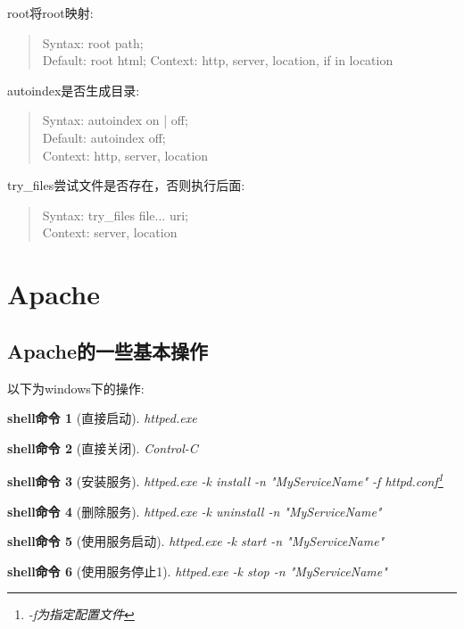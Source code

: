 \documentclass[UTF8]{ctexart}
\newtheorem{shellcommand}{shell命令}
\newenvironment{myquote}
  {\begin{quote} \kaishu \zihao{-5}}
  {\end{quote}}
\begin{document}
root将root映射:
\begin{myquote}
  Syntax: root path; \\
  Default: root html;
  Context: http, server, location, if in location
\end{myquote}

autoindex是否生成目录:
\begin{myquote}
  Syntax: autoindex on | off; \\
  Default: autoindex off; \\
  Context: http, server, location
\end{myquote}

try\_files尝试文件是否存在，否则执行后面:
\begin{myquote}
  Syntax: try\_files file... uri; \\
  Context: server, location
\end{myquote}

\clearpage


\section{Apache}
\subsection{Apache的一些基本操作}
以下为windows下的操作:
\begin{shellcommand}[直接启动]
  httped.exe
\end{shellcommand}

\begin{shellcommand}[直接关闭]
  Control-C
\end{shellcommand}

\begin{shellcommand}[安装服务]
  httped.exe -k install -n "MyServiceName" -f httpd.conf\footnote{-f为指定配置文件}
\end{shellcommand}

\begin{shellcommand}[删除服务]
  httped.exe -k uninstall -n "MyServiceName"
\end{shellcommand}

\begin{shellcommand}[使用服务启动]
  httped.exe -k start -n "MyServiceName"
\end{shellcommand}

\begin{shellcommand}[使用服务停止1]
  httped.exe -k stop -n "MyServiceName"
\end{shellcommand}
\end{document}
